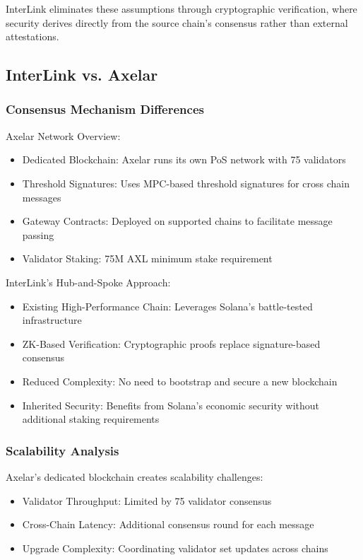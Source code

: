 \documentclass[11pt,a4paper]{article}
\begin{document}
InterLink eliminates these assumptions through cryptographic verification, where security derives directly from the source chain's consensus rather than external attestations.

\subsection{InterLink vs. Axelar}

\subsubsection{Consensus Mechanism Differences}

Axelar Network Overview:
\begin{itemize}
    \item Dedicated Blockchain: Axelar runs its own PoS network with 75 validators
    \item Threshold Signatures: Uses MPC-based threshold signatures for cross chain messages
    \item Gateway Contracts: Deployed on supported chains to facilitate message passing
    \item Validator Staking: 75M AXL minimum stake requirement
\end{itemize}

InterLink's Hub-and-Spoke Approach:
\begin{itemize}
    \item Existing High-Performance Chain: Leverages Solana's battle-tested infrastructure
    \item ZK-Based Verification: Cryptographic proofs replace signature-based consensus
    \item Reduced Complexity: No need to bootstrap and secure a new blockchain
    \item Inherited Security: Benefits from Solana's economic security without additional staking requirements
\end{itemize}

\subsubsection{Scalability Analysis}

Axelar's dedicated blockchain creates scalability challenges:
\begin{itemize}
    \item Validator Throughput: Limited by 75 validator consensus
    \item Cross-Chain Latency: Additional consensus round for each message
    \item Upgrade Complexity: Coordinating validator set updates across chains
\end{itemize}
\end{document}
